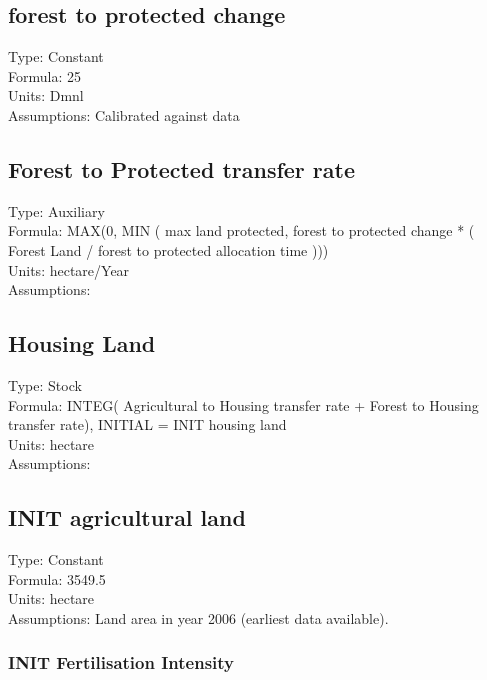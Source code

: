 \documentclass[
  11pt,
]{book}
\begin{document}
\hypertarget{forest-to-protected-change}{%
\subsection{forest to protected change}\label{forest-to-protected-change}}

Type: Constant\\
Formula: 25\\
Units: Dmnl\\
Assumptions: Calibrated against data

\hypertarget{forest-to-protected-transfer-rate}{%
\subsection{Forest to Protected transfer rate}\label{forest-to-protected-transfer-rate}}

Type: Auxiliary\\
Formula: MAX(0, MIN ( max land protected, forest to protected change * ( Forest Land / forest to protected allocation time )))\\
Units: hectare/Year\\
Assumptions:

\hypertarget{housing-land}{%
\subsection{Housing Land}\label{housing-land}}

Type: Stock\\
Formula: INTEG( Agricultural to Housing transfer rate + Forest to Housing transfer rate), INITIAL = INIT housing land\\
Units: hectare\\
Assumptions:

\hypertarget{init-agricultural-land}{%
\subsection{INIT agricultural land}\label{init-agricultural-land}}

Type: Constant\\
Formula: 3549.5\\
Units: hectare\\
Assumptions: Land area in year 2006 (earliest data available).

\hypertarget{init-fertilisation-intensity}{%
\subsubsection{INIT Fertilisation Intensity}\label{init-fertilisation-intensity}}
\end{document}
